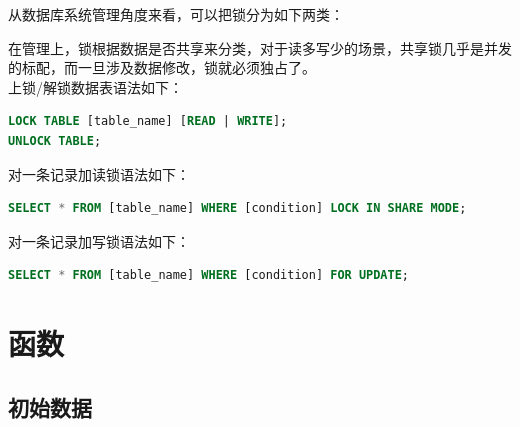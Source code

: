 \documentclass[12pt, openany, oneside]{book}
\begin{document}
从数据库系统管理角度来看，可以把锁分为如下两类：

\begin{table}[H]
    \centering
    \caption{锁的管理分类}
\end{table}

在管理上，锁根据数据是否共享来分类，对于读多写少的场景，共享锁几乎是并发的标配，而一旦涉及数据修改，锁就必须独占了。 \\

上锁/解锁数据表语法如下：

\vspace{-0.5cm}

\begin{lstlisting}[language=SQL]
LOCK TABLE [table_name] [READ | WRITE];
UNLOCK TABLE;
\end{lstlisting}

对一条记录加读锁语法如下：

\vspace{-0.5cm}

\begin{lstlisting}[language=SQL]
SELECT * FROM [table_name] WHERE [condition] LOCK IN SHARE MODE;
\end{lstlisting}

对一条记录加写锁语法如下：

\vspace{-0.5cm}

\begin{lstlisting}[language=SQL]
SELECT * FROM [table_name] WHERE [condition] FOR UPDATE;
\end{lstlisting}

\newpage

\chapter{函数}

\section{初始数据}
\end{document}
